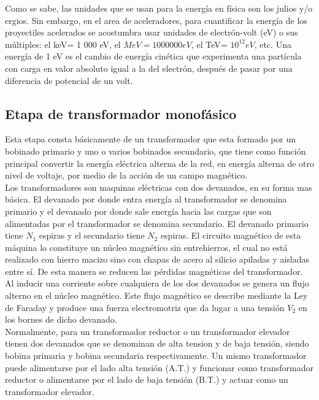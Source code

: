 Como se sabe, las unidades que se usan para la energía en física son los julios
y/o ergios. Sin embargo, en el area de aceleradores, para cuantificar la energía de los proyectiles acelerados se acostumbra usar unidades de electrón-volt (eV)  o sus múltiples: el keV= 1 000 eV, el $MeV= 1 000 000 eV$, el TeV= $10^{12} eV$, etc. Una energía de 1 eV es el cambio de energía cinética que experimenta una partícula con carga en valor absoluto igual a la del electrón, después de pasar por una diferencia de potencial de un volt. \cite{const}

\newpage



\subsection{Etapa de transformador monofásico}

Esta etapa consta básicamente de un transformador que esta formado por un bobinado primario y uno o varios bobinados secundario, que tiene como función principal
convertir la energía eléctrica alterna de la red, en energía alterna de otro nivel de voltaje, por medio de la acción de un campo magnético.\\

Los transformadores son maquinas eléctricas con dos devanados, en su forma mas básica. El devanado por donde entra energía al transformador se denomina primario y el devanado por donde sale energía hacia las cargas que son alimentadas por el transformador se denomina secundario. El devanado primario tiene $N_{1}$ espiras y el secundario tiene $N_{2}$ espiras. El circuito magnético de esta máquina lo constituye un núcleo magnético sin entrehierros, el cual no está realizado con hierro macizo sino con chapas de acero al silicio apiladas y aisladas entre sí. De esta manera se reducen las pérdidas magnéticas del transformador.\\

Al inducir una corriente sobre cualquiera de los dos devanados se genera un flujo alterno en el núcleo magnético. Este flujo magnético se describe mediante la Ley de Faraday\cite{librotra} y produce una fuerza electromotriz que da lugar a una tensión $V_{2}$ en los bornes de dicho devanado.\\

Normalmente, para un transformador reductor o un transformador elevador tienen dos devanados que se denominan de alta tension y de baja tensión, siendo bobina primaria y bobina secundaria respectivamente. Un mismo transformador puede alimentarse por el lado alta tensión (A.T.) y funcionar como transformador reductor o alimentarse por el lado de baja tensión (B.T.) y actuar como un transformador elevador.

